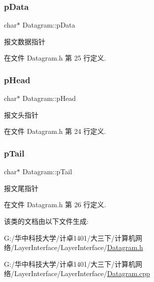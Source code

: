 \subsubsection{\texorpdfstring{p\+Data}{pData}}
{\footnotesize\ttfamily char$\ast$ Datagram\+::p\+Data}

报文数据指针 

在文件 Datagram.\+h 第 25 行定义.

\mbox{\label{class_datagram_ac71eedd18cac5107f545043abd2d2655}} 
\subsubsection{\texorpdfstring{p\+Head}{pHead}}
{\footnotesize\ttfamily char$\ast$ Datagram\+::p\+Head}

报文头指针 

在文件 Datagram.\+h 第 24 行定义.

\mbox{\label{class_datagram_af4d0826f99eb27b443a48ddc21e6815f}} 
\subsubsection{\texorpdfstring{p\+Tail}{pTail}}
{\footnotesize\ttfamily char$\ast$ Datagram\+::p\+Tail}

报文尾指针 

在文件 Datagram.\+h 第 26 行定义.



该类的文档由以下文件生成\+:\begin{DoxyCompactItemize}
\item 
G\+:/华中科技大学/计卓1401/大三下/计算机网络/\+Layer\+Interface/\+Layer\+Interface/\hyperlink{_datagram_8h}{Datagram.\+h}\item 
G\+:/华中科技大学/计卓1401/大三下/计算机网络/\+Layer\+Interface/\+Layer\+Interface/\hyperlink{_datagram_8cpp}{Datagram.\+cpp}\end{DoxyCompactItemize}
